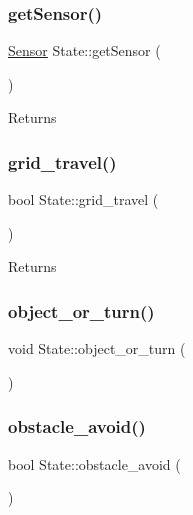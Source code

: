 \subsubsection{\texorpdfstring{get\+Sensor()}{getSensor()}}
{\footnotesize\ttfamily \mbox{\hyperlink{class_sensor}{Sensor}} State\+::get\+Sensor (\begin{DoxyParamCaption}{ }\end{DoxyParamCaption})}

\begin{DoxyReturn}{Returns}

\end{DoxyReturn}
\mbox{\label{class_state_a4e9d67c11218113bfa282ddccfd6326a}} 
\subsubsection{\texorpdfstring{grid\+\_\+travel()}{grid\_travel()}}
{\footnotesize\ttfamily bool State\+::grid\+\_\+travel (\begin{DoxyParamCaption}{ }\end{DoxyParamCaption})}

\begin{DoxyReturn}{Returns}

\end{DoxyReturn}
\mbox{\label{class_state_ae03eae00675106f8b6b9481c4b0e50dc}} 
\subsubsection{\texorpdfstring{object\+\_\+or\+\_\+turn()}{object\_or\_turn()}}
{\footnotesize\ttfamily void State\+::object\+\_\+or\+\_\+turn (\begin{DoxyParamCaption}{ }\end{DoxyParamCaption})}

\mbox{\label{class_state_a975afaa8e6091654888d7ed58b8c29c1}} 
\subsubsection{\texorpdfstring{obstacle\+\_\+avoid()}{obstacle\_avoid()}}
{\footnotesize\ttfamily bool State\+::obstacle\+\_\+avoid (\begin{DoxyParamCaption}{ }\end{DoxyParamCaption})}

